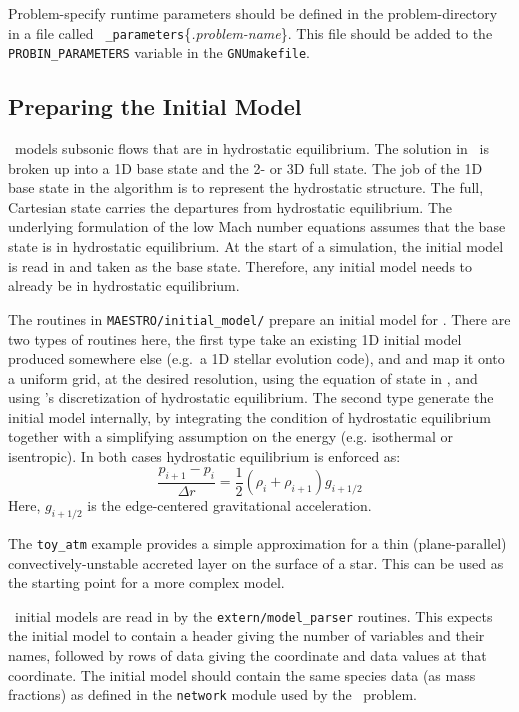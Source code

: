 Problem-specify runtime parameters should be defined in the
problem-directory in a file called {\tt
  \_parameters}\{{\em.problem-name}\}.  This file should be added
to the {\tt PROBIN\_PARAMETERS} variable in the {\tt GNUmakefile}.



\subsection{Preparing the Initial Model}

\label{sec:initial_models}

\maestro\ models subsonic flows that are in hydrostatic equilibrium.
The solution in \maestro\ is broken up into a 1D base state and the 2-
or 3D full state.  The job of the 1D base state in the algorithm is
to represent the hydrostatic structure.  The full, Cartesian state
carries the departures from hydrostatic equilibrium.  The underlying
formulation of the low Mach number equations assumes that the base
state is in hydrostatic equilibrium.  At the start of a simulation,
the initial model is read in and taken as the base state.  Therefore,
any initial model needs to already be in hydrostatic equilibrium.

The routines in {\tt MAESTRO/initial\_model/} prepare an initial model
for \maestro.  There are two types of routines here, the first type
take an existing 1D initial model produced somewhere else (e.g.\ a
1D stellar evolution code), and and map it onto a uniform grid, at
the desired resolution, using the equation of state in \maestro, and
using \maestro's discretization of hydrostatic equilibrium.  The second
type generate the initial model internally, by integrating the
condition of hydrostatic equilibrium together with a simplifying
assumption on the energy (e.g. isothermal or isentropic).  In
both cases hydrostatic equilibrium is enforced as:
\begin{equation}
\frac{p_{i+1} - p_i}{\Delta r} = \frac{1}{2} (\rho_i + \rho_{i+1})
g_{i+1/2}
\end{equation}
Here, $g_{i+1/2}$ is the edge-centered gravitational acceleration.

The {\tt toy\_atm} example provides a simple approximation for a thin
(plane-parallel) convectively-unstable accreted layer on the surface
of a star.  This can be used as the starting point for a more complex
model.  

\maestro\ initial models are read in by the {\tt extern/model\_parser}
routines.  This expects the initial model to contain a header giving
the number of variables and their names, followed by rows of data
giving the coordinate and data values at that coordinate.  The initial
model should contain the same species data (as mass fractions) as
defined in the {\tt network} module used by the \maestro\ problem.

